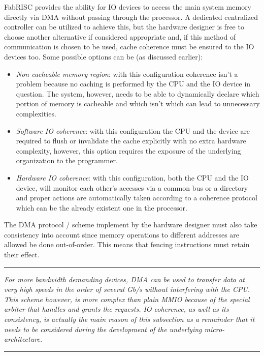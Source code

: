 \documentclass{article}
\begin{document}
            FabRISC provides the ability for IO devices to access the main system memory directly via DMA without passing through the processor. A dedicated centralized controller can be utilized to achieve this, but the hardware designer is free to choose another alternative if considered appropriate and, if this method of communication is chosen to be used, cache coherence must be ensured to the IO devices too. Some possible options can be (as discussed earlier):

            \begin{itemize}

                \item \textit{Non cacheable memory region}: with this configuration coherence isn't a problem because no caching is performed by the CPU and the IO device in question. The system, however, needs to be able to dynamically declare which portion of memory is cacheable and which isn't which can lead to unnecessary complexities.
                \item \textit{Software IO coherence}: with this configuration the CPU and the device are required to flush or invalidate the cache explicitly with no extra hardware complexity, however, this option requires the exposure of the underlying organization to the programmer.
                \item \textit{Hardware IO coherence}: with this configuration, both the CPU and the IO device, will monitor each other's accesses via a common bus or a directory and proper actions are automatically taken according to a coherence protocol which can be the already existent one in the processor.

            \end{itemize}

            The DMA protocol / scheme implement by the hardware designer must also take consistency into account since memory operations to different addresses are allowed be done out-of-order. This means that fencing instructions must retain their effect.

        \par\noindent\rule{\textwidth}{0.4pt}
        \textit{For more bandwidth demanding devices, DMA can be used to transfer data at very high speeds in the order of several Gb/s without interfering with the CPU. This scheme however, is more complex than plain MMIO because of the special arbiter that handles and grants the requests. IO coherence, as well as its consistency, is actually the main reason of this subsection as a remainder that it needs to be considered during the development of the underlying micro-architecture.}
        \par\noindent\rule{\textwidth}{0.4pt}
\end{document}
